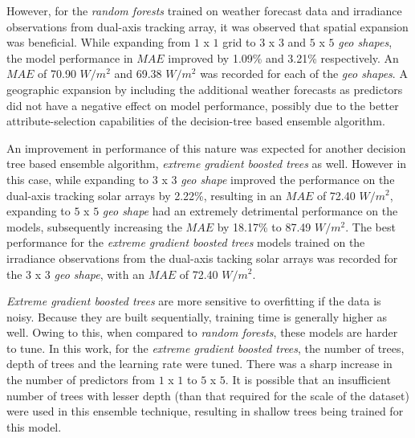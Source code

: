 \par However, for the \textit{random forests} trained on weather forecast data and irradiance observations from dual-axis tracking array, it was observed that spatial expansion was beneficial. While expanding from $1$ x $1$ grid to $3$ x $3$ and $5$ x $5$ \textit{geo shapes}, the model performance in $MAE$ improved by 1.09\% and 3.21\% respectively. An $MAE$ of 70.90 $W/m^2$ and 69.38 $W/m^2$ was recorded for each of the \textit{geo shapes}. A geographic expansion by including the additional weather forecasts as predictors did not have a negative effect on model performance, possibly due to the better attribute-selection capabilities of the decision-tree based ensemble algorithm.

\par An improvement in performance of this nature was expected for another decision tree based ensemble algorithm, \textit{extreme gradient boosted trees} as well. However in this case, while expanding to $3$ x $3$ \textit{geo shape} improved the performance on the dual-axis tracking solar arrays by 2.22\%, resulting in an $MAE$ of 72.40 $W/m^2$, expanding to $5$ x $5$ \textit{geo shape} had an extremely detrimental performance on the models, subsequently increasing the $MAE$ by 18.17\% to 87.49 $W/m^2$. The best performance for the \textit{extreme gradient boosted trees} models trained on the irradiance observations from the dual-axis tacking solar arrays was recorded for the $3$ x $3$ \textit{geo shape}, with an $MAE$ of 72.40 $W/m^2$. 

\par \textit{Extreme gradient boosted trees} are more sensitive to overfitting if the data is noisy. Because they are built sequentially, training time is generally higher as well. Owing to this, when compared to \textit{random forests}, these models are harder to tune. In this work, for the \textit{extreme gradient boosted trees}, the number of trees, depth of trees and the learning rate were tuned. There was a sharp increase in the number of predictors from $1$ x $1$ to $5$ x $5$. It is possible that an insufficient number of trees with lesser depth (than that required for the scale of the dataset) were used in this ensemble technique, resulting in shallow trees being trained for this model.

